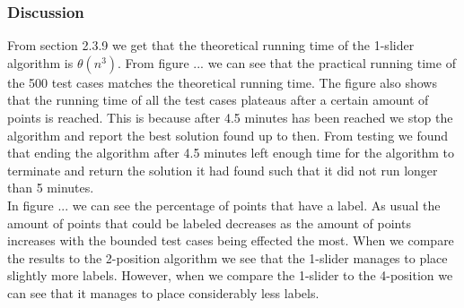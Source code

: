 \documentclass[crop=false,a4paper,oneside,11pt]{standalone}
\begin{document}
\subsubsection{Discussion}
From section 2.3.9 we get that the theoretical running time of the 1-slider algorithm is $\theta(n^3)$. From figure ... we can see that the practical running time of the 500 test cases matches the theoretical running time. The figure also shows that the running time of all the test cases plateaus after a certain amount of points is reached. This is because after 4.5 minutes has been reached we stop the algorithm and report the best solution found up to then. From testing we found that ending the algorithm after 4.5 minutes left enough time for the algorithm to terminate and return the solution it had found such that it did not run longer than 5 minutes.\\
In figure ... we can see the percentage of points that have a label. As usual the amount of points that could be labeled decreases as the amount of points increases with the bounded test cases being effected the most. When we compare the results to the 2-position algorithm we see that the 1-slider manages to place slightly more labels. However, when we compare the 1-slider to the 4-position we can see that it manages to place considerably less labels.
\end{document}
